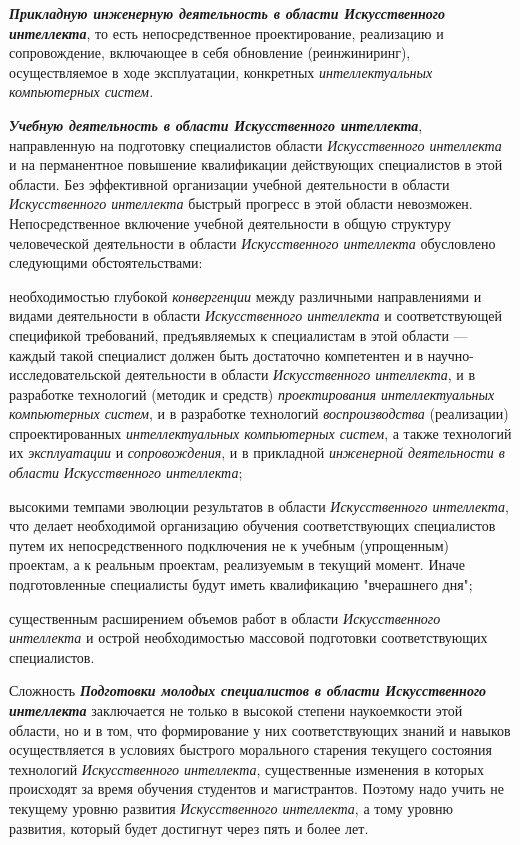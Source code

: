 \begin{textitemize}
	\item
	\textbf{\textit{Прикладную инженерную деятельность в области Искусственного интеллекта}}, то есть непосредственное проектирование, реализацию и сопровождение, включающее в себя обновление (реинжиниринг), осуществляемое в ходе эксплуатации, конкретных \textit{интеллектуальных компьютерных систем.}
	\item
	\textbf{\textit{Учебную деятельность в области Искусственного интеллекта}}, направленную на подготовку специалистов области \textit{Искусственного интеллекта} и на перманентное повышение квалификации действующих специалистов в этой области. Без эффективной организации учебной деятельности в области \textit{Искусственного интеллекта} быстрый прогресс в этой области невозможен. Непосредственное включение учебной деятельности в общую структуру человеческой деятельности в области \textit{Искусственного интеллекта} обусловлено следующими обстоятельствами:
	\begin{textitemize}
		\item
		необходимостью глубокой \textit{конвергенции} между различными направлениями и видами деятельности в области \textit{Искусственного интеллекта} и соответствующей спецификой требований, предъявляемых к специалистам в этой области --- каждый такой специалист должен быть достаточно компетентен и в научно-исследовательской деятельности в области \textit{Искусственного интеллекта}, и в разработке технологий (методик и средств) \textit{проектирования интеллектуальных компьютерных систем}, и в разработке технологий \textit{воспроизводства} (реализации) спроектированных \textit{интеллектуальных компьютерных систем}, а также технологий их \textit{эксплуатации} и \textit{сопровождения}, и в прикладной \textit{инженерной деятельности в области} \textit{Искусственного интеллекта};
		\item
		высокими темпами эволюции результатов в области \textit{Искусственного интеллекта}, что делает необходимой организацию обучения соответствующих специалистов путем их непосредственного подключения не к учебным (упрощенным) проектам, а к реальным проектам, реализуемым в текущий момент. Иначе подготовленные специалисты будут иметь квалификацию "вчерашнего дня"{};
		\item
		существенным расширением объемов работ в области \textit{Искусственного интеллекта} и острой необходимостью массовой подготовки соответствующих специалистов.
	\end{textitemize}
	
	Сложность \textbf{\textit{Подготовки молодых специалистов в области Искусственного интеллекта}} заключается не только в высокой степени наукоемкости этой области, но и в том, что формирование у них соответствующих знаний и навыков осуществляется в условиях быстрого морального старения текущего состояния технологий \textit{Искусственного интеллекта}, существенные изменения в которых происходят за время обучения студентов и магистрантов. Поэтому надо учить не текущему уровню развития \textit{Искусственного интеллекта}, а тому уровню развития, который будет достигнут через пять и более лет.
	

\end{textitemize}
